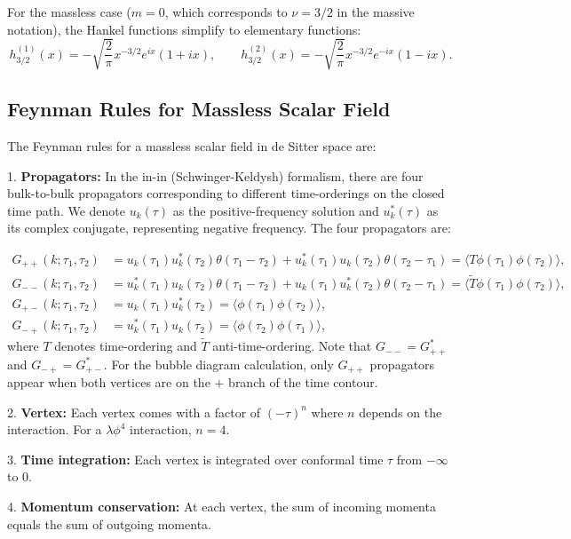 \documentclass[a4paper,12pt]{article}
\def\bge{\begin{equation}}
\def\ede{\end{equation}}
\begin{document}
For the massless case ($m=0$, which corresponds to $\nu = 3/2$ in the massive notation), the Hankel functions simplify to elementary functions:
\bge
h_{3/2}^{(1)}(x) = -\sqrt{\frac{2}{\pi}} x^{-3/2} e^{ix}(1 + ix), \qquad
h_{3/2}^{(2)}(x) = -\sqrt{\frac{2}{\pi}} x^{-3/2} e^{-ix}(1 - ix).
\ede

\subsection{Feynman Rules for Massless Scalar Field}

The Feynman rules for a massless scalar field in de Sitter space are:

1. \textbf{Propagators:} In the in-in (Schwinger-Keldysh) formalism, there are four bulk-to-bulk propagators corresponding to different time-orderings on the closed time path. We denote $u_k(\tau)$ as the positive-frequency solution and $u_k^*(\tau)$ as its complex conjugate, representing negative frequency. The four propagators are:

\begin{align}
	G_{++}(k;\tau_1,\tau_2) & = u_k(\tau_1)u_k^*(\tau_2)\theta(\tau_1-\tau_2)
	+ u_k^*(\tau_1)u_k(\tau_2)\theta(\tau_2-\tau_1)
	= \langle T \phi(\tau_1)\phi(\tau_2) \rangle,                             \\
	G_{--}(k;\tau_1,\tau_2) & = u_k^*(\tau_1)u_k(\tau_2)\theta(\tau_1-\tau_2)
	+ u_k(\tau_1)u_k^*(\tau_2)\theta(\tau_2-\tau_1)
	= \langle \tilde{T} \phi(\tau_1)\phi(\tau_2) \rangle,                     \\
	G_{+-}(k;\tau_1,\tau_2) & = u_k(\tau_1)u_k^*(\tau_2)
	= \langle \phi(\tau_1)\phi(\tau_2) \rangle,                               \\
	G_{-+}(k;\tau_1,\tau_2) & = u_k^*(\tau_1)u_k(\tau_2)
	= \langle \phi(\tau_2)\phi(\tau_1) \rangle,
\end{align}
where $T$ denotes time-ordering and $\tilde{T}$ anti-time-ordering. Note that $G_{--} = G_{++}^*$ and $G_{-+} = G_{+-}^*$. For the bubble diagram calculation, only $G_{++}$ propagators appear when both vertices are on the $+$ branch of the time contour.

2. \textbf{Vertex:} Each vertex comes with a factor of $(-\tau)^n$ where $n$ depends on the interaction. For a $\lambda\phi^4$ interaction, $n=4$.

3. \textbf{Time integration:} Each vertex is integrated over conformal time $\tau$ from $-\infty$ to $0$.

4. \textbf{Momentum conservation:} At each vertex, the sum of incoming momenta equals the sum of outgoing momenta.
\end{document}
